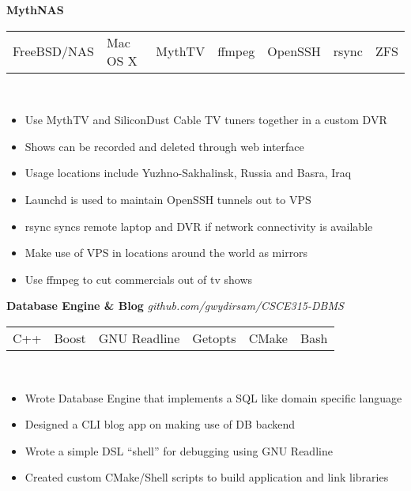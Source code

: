\documentclass[margin,line,12pt]{res}
\begin{document}
{\begin{resume}
{\bf MythNAS} \
\\
\begin{tabular}{l l l l l l l}
  FreeBSD/NAS & Mac OS X & MythTV & ffmpeg & OpenSSH & rsync & ZFS
\end{tabular}
\\
\vspace{-.10in}
\begin{itemize}
  \item Use MythTV and SiliconDust Cable TV tuners together in a custom DVR
  \item Shows can be recorded and deleted through web interface
  \item Usage locations include Yuzhno-Sakhalinsk, Russia and Basra, Iraq
  \item Launchd is used to maintain OpenSSH tunnels out to VPS
  \item rsync syncs remote laptop and DVR if network connectivity is available
  \item Make use of VPS in locations around the world as mirrors
  \item Use ffmpeg to cut commercials out of tv shows
\end{itemize}

{\bf Database Engine \& Blog } {\em  github.com/gwydirsam/CSCE315-DBMS }  \
\\
\begin{tabular}{l l l l l l}
  C++ & Boost & GNU Readline & Getopts & CMake & Bash
\end{tabular}
\\
\vspace{-.10in}
\begin{itemize}
  \item Wrote Database Engine that implements a SQL like domain specific language
  \item Designed a CLI blog app on making use of DB backend
  \item Wrote a simple DSL ``shell'' for debugging using GNU Readline
  \item Created custom CMake/Shell scripts to build application and link libraries
\end{itemize}


\end{resume}}
\end{document}
